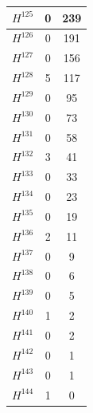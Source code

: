 \begin{tabular}{|c|c|c|}
\hline
$H^{125}$&0&239\\\hline
$H^{126}$&0&191\\\hline
$H^{127}$&0&156\\\hline
$H^{128}$&5&117\\\hline
$H^{129}$&0&95\\\hline
$H^{130}$&0&73\\\hline
$H^{131}$&0&58\\\hline
$H^{132}$&3&41\\\hline
$H^{133}$&0&33\\\hline
$H^{134}$&0&23\\\hline
$H^{135}$&0&19\\\hline
$H^{136}$&2&11\\\hline
$H^{137}$&0&9\\\hline
$H^{138}$&0&6\\\hline
$H^{139}$&0&5\\\hline
$H^{140}$&1&2\\\hline
$H^{141}$&0&2\\\hline
$H^{142}$&0&1\\\hline
$H^{143}$&0&1\\\hline
$H^{144}$&1&0\\ \hline
\end{tabular}